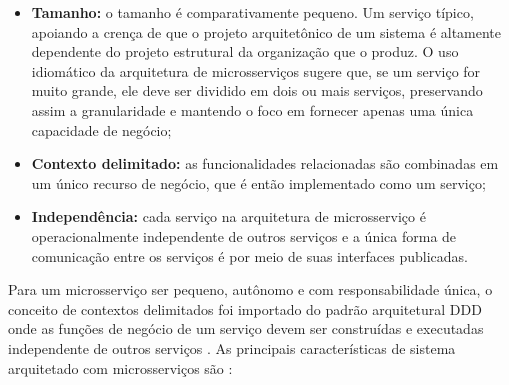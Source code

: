 \begin{itemize}
    \item \textbf{Tamanho:} o tamanho é comparativamente pequeno. Um serviço típico, apoiando a crença de que o projeto arquitetônico de um sistema é altamente dependente do projeto estrutural da organização que o produz. O uso idiomático da arquitetura de microsserviços sugere que, se um serviço for muito grande, ele deve ser dividido em dois ou mais serviços, preservando assim a granularidade e mantendo o foco em fornecer apenas uma única capacidade de negócio;
    \item \textbf{Contexto delimitado:} as funcionalidades relacionadas são combinadas em um único recurso de negócio, que é então implementado como um serviço;
    \item \textbf{Independência:} cada serviço na arquitetura de microsserviço é operacionalmente independente de outros serviços e a única forma de comunicação entre os serviços é por meio de suas interfaces publicadas.
\end{itemize}

Para um microsserviço ser pequeno, autônomo e com responsabilidade única, o conceito de contextos delimitados foi importado do padrão arquitetural \acrfull{DDD} onde as funções de negócio de um serviço devem ser construídas e executadas independente de outros serviços \cite{Richardson2016}. As principais características de sistema arquitetado com microsserviços são \cite{Dragoni2016}:

